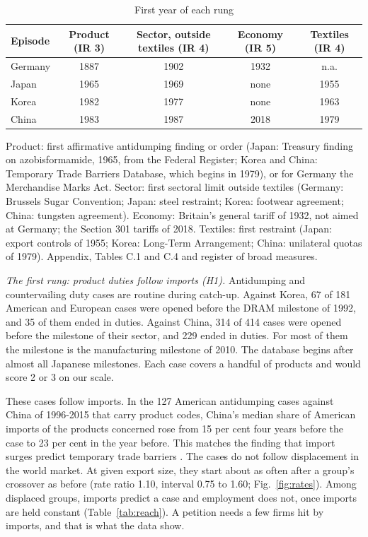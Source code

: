 \documentclass[review,authoryear,12pt]{elsarticle}
\newcommand{\tabnote}[1]{\par\smallskip\begin{minipage}{\linewidth}\footnotesize #1\end{minipage}}
\begin{document}
\begin{table}[t]
\centering\small
\caption{First year of each rung}\label{tab:rungs}
\begin{tabular}{lcccc}
\toprule
Episode & Product (IR 3) & Sector, outside textiles (IR 4) & Economy (IR 5) & Textiles (IR 4) \\
\midrule
Germany & 1887 & 1902 & 1932 & n.a. \\
Japan & 1965 & 1969 & none & 1955 \\
Korea & 1982 & 1977 & none & 1963 \\
China & 1983 & 1987 & 2018 & 1979 \\
\bottomrule
\end{tabular}

\tabnote{Product: first affirmative antidumping finding or order (Japan: Treasury finding on azobisformamide, 1965, from the Federal Register; Korea and China: Temporary Trade Barriers Database, which begins in 1979), or for Germany the Merchandise Marks Act. Sector: first sectoral limit outside textiles (Germany: Brussels Sugar Convention; Japan: steel restraint; Korea: footwear agreement; China: tungsten agreement). Economy: Britain's general tariff of 1932, not aimed at Germany; the Section 301 tariffs of 2018. Textiles: first restraint (Japan: export controls of 1955; Korea: Long-Term Arrangement; China: unilateral quotas of 1979). Appendix, Tables C.1 and C.4 and register of broad measures.}
\end{table}

\emph{The first rung: product duties follow imports (H1).} Antidumping and countervailing duty cases are routine during catch-up. Against Korea, 67 of 181 American and European cases were opened before the DRAM milestone of 1992, and 35 of them ended in duties. Against China, 314 of 414 cases were opened before the milestone of their sector, and 229 ended in duties. For most of them the milestone is the manufacturing milestone of 2010. The database begins after almost all Japanese milestones. Each case covers a handful of products and would score 2 or 3 on our scale.

These cases follow imports. In the 127 American antidumping cases against China of 1996-2015 that carry product codes, China's median share of American imports of the products concerned rose from 15 per cent four years before the case to 23 per cent in the year before. This matches the finding that import surges predict temporary trade barriers \citep{bown2013aer}. The cases do not follow displacement in the world market. At given export size, they start about as often after a group's crossover as before (rate ratio 1.10, interval 0.75 to 1.60; Fig.~\ref{fig:rates}). Among displaced groups, imports predict a case and employment does not, once imports are held constant (Table~\ref{tab:reach}). A petition needs a few firms hit by imports, and that is what the data show.
\end{document}
